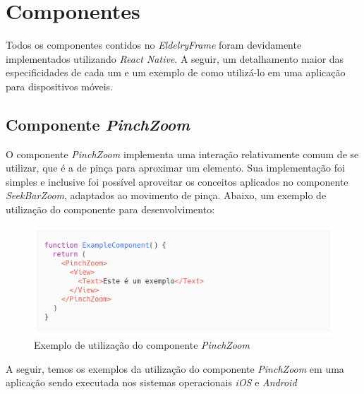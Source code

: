 \documentclass[
	12pt,				    %
	openright,			    %
	oneside,			    %
	a4paper,			    %
    sumario=tradicional,    %
	english,			    %
	brazil,				    %
	]{abntex2}              %
\begin{document}
\section{Componentes}

Todos os componentes contidos no \textit{EldelryFrame} foram devidamente implementados utilizando \textit{React Native}. A seguir, um detalhamento maior das especificidades de cada um e um exemplo de como utilizá-lo em uma aplicação para dispositivos móveis.

\subsection{Componente \textit{PinchZoom}}

O componente \textit{PinchZoom} implementa uma interação relativamente comum de se utilizar, que é a de pinça para aproximar um elemento. Sua implementação foi simples e inclusive foi possível aproveitar os conceitos aplicados no componente \textit{SeekBarZoom}, adaptados ao movimento de pinça. Abaixo, um exemplo de utilização do componente para desenvolvimento:

\begin{figure}[H]
	\begin{center}
		\includegraphics[width=.8\linewidth]{images/PinchZoom.png}
		\caption[Componente \textit{PinchZoom}]{Exemplo de utilização do componente \textit{PinchZoom}}
		\label{fig:pinchZoomExample}
	\end{center}
\end{figure}

\par

A seguir, temos os exemplos da utilização do componente \textit{PinchZoom} em uma aplicação sendo executada nos sistemas operacionais \textit{iOS} e \textit{Android}
\end{document}
